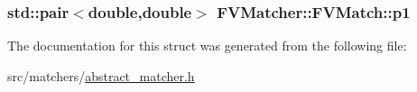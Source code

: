 \subsubsection[{p1}]{\setlength{\rightskip}{0pt plus 5cm}std\+::pair$<$double,double$>$ F\+V\+Matcher\+::\+F\+V\+Match\+::p1}\label{structFVMatcher_1_1FVMatch_a99228c63852266ed5ef0c7226e178c57}


The documentation for this struct was generated from the following file\+:\begin{DoxyCompactItemize}
\item 
src/matchers/\hyperlink{abstract__matcher_8h}{abstract\+\_\+matcher.\+h}\end{DoxyCompactItemize}
